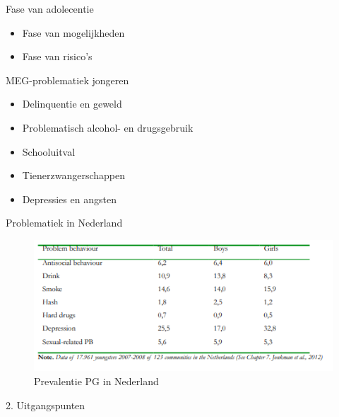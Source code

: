 \documentclass[
  ignorenonframetext,
]{beamer}
\providecommand{\tightlist}{%
  \setlength{\itemsep}{0pt}\setlength{\parskip}{0pt}}\usepackage{longtable,booktabs,array}
\begin{document}
\begin{frame}{Fase van adolecentie}
\protect\hypertarget{fase-van-adolecentie}{}
\begin{itemize}
\item
  Fase van mogelijkheden
\item
  Fase van risico's
\end{itemize}
\end{frame}

\begin{frame}{MEG-problematiek jongeren}
\protect\hypertarget{meg-problematiek-jongeren}{}
\begin{itemize}
\tightlist
\item
  Delinquentie en geweld\\
\item
  Problematisch alcohol- en drugsgebruik\\
\item
  Schooluitval\\
\item
  Tienerzwangerschappen\\
\item
  Depressies en angsten
\end{itemize}
\end{frame}

\begin{frame}{Problematiek in Nederland}
\protect\hypertarget{problematiek-in-nederland}{}
\begin{figure}

{\centering \includegraphics{images/TabelPG.png}

}

\caption{Prevalentie PG in Nederland}

\end{figure}
\end{frame}

\begin{frame}{2. Uitgangspunten}
\protect\hypertarget{uitgangspunten}{}
\end{frame}
\end{document}
